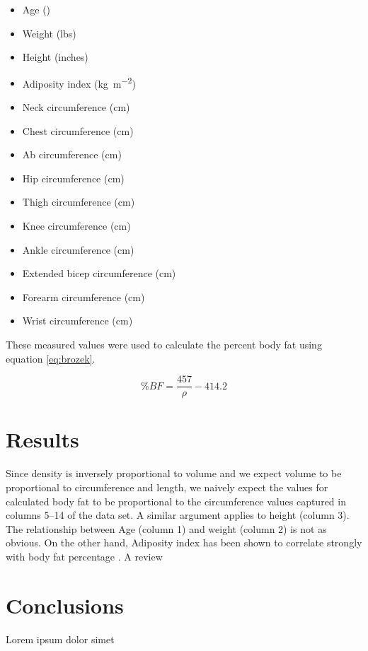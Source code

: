 \documentclass{IEEEtran}
\begin{document}
\begin{itemize}
	\item Age (\si{\year})
	\item Weight (lbs)
	\item Height (inches)
	\item Adiposity index (\si{\kilo\gram\per\meter^2})
	\item Neck circumference (\si{\centi\meter})
	\item Chest circumference (\si{\centi\meter})
	\item Ab circumference (\si{\centi\meter})
	\item Hip circumference (\si{\centi\meter})
	\item Thigh circumference (\si{\centi\meter})
	\item Knee circumference (\si{\centi\meter})
	\item Ankle circumference (\si{\centi\meter})
	\item Extended bicep circumference (\si{\centi\meter})
	\item Forearm circumference (\si{\centi\meter})
	\item Wrist circumference (\si{\centi\meter})
\end{itemize}

These measured values were used to calculate the percent body fat using equation \ref{eq:brozek}.

\begin{equation}
	\%BF = \frac{457}{\rho} - 414.2
	\label{eq:brozek}
\end{equation}

\section{Results}
Since density is inversely proportional to volume and we expect volume to be proportional to circumference and length, we naively expect the values for calculated body fat to be proportional to the circumference values captured in columns \numrange{5}{14} of the data set. A similar argument applies to height (column \num{3}). The relationship between Age (column \num{1}) and weight (column \num{2}) is not as obvious. On the other hand, Adiposity index has been shown to correlate strongly with body fat percentage \cite{needreference}. A review 



\section{Conclusions}
Lorem ipsum dolor simet

\nocite{*}
\printbibliography
\end{document}
